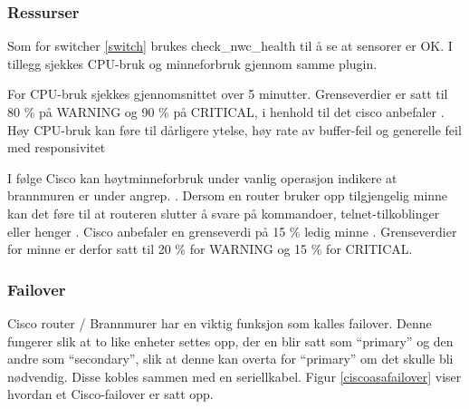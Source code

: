 \subsubsection{Ressurser}

Som for switcher \ref{switch} brukes check\_nwc\_health til å se at sensorer er OK. I tillegg
sjekkes CPU-bruk og minneforbruk gjennom samme plugin. 

For CPU-bruk sjekkes gjennomsnittet over 5 minutter. Grenseverdier er satt til 80 \% på WARNING og 90 \% på CRITICAL, i henhold til det cisco anbefaler \cite{ciscounifiedcommunication}. Høy CPU-bruk kan føre til dårligere ytelse, høy rate av buffer-feil og generelle feil med responsivitet \cite{ciscocpurouters}

I følge Cisco kan høytminneforbruk under vanlig operasjon indikere at brannmuren er under angrep. \cite{ciscomem}. Dersom en router bruker opp tilgjengelig minne kan det føre til at routeren slutter å svare på kommandoer, telnet-tilkoblinger eller henger \cite{ciscomemproblem} . Cisco anbefaler en grenseverdi på 15 \% ledig minne \cite{ciscounifiedcommunication}. Grenseverdier for minne er derfor satt til 20 \% for WARNING og 15 \% for CRITICAL.

\subsubsection{Failover}

Cisco router / Brannmurer har en viktig funksjon som kalles failover. Denne fungerer slik at to like enheter settes opp, der en blir satt som “primary” og den andre som “secondary”, slik at denne kan overta for “primary” om det skulle bli nødvendig. Disse kobles sammen med en seriellkabel. Figur \ref{ciscoasafailover} viser hvordan et Cisco-failover er satt opp. 

